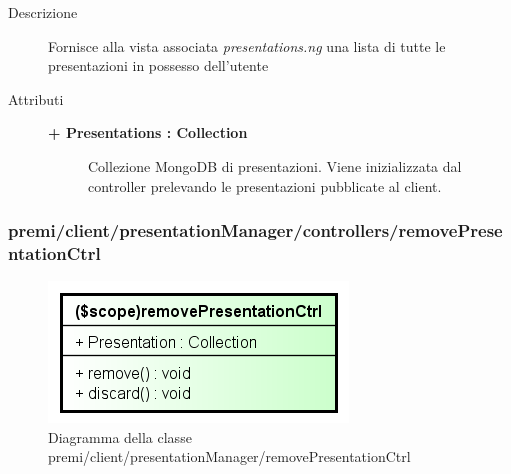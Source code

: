 \begin{description}
\item[Descrizione] \hfill
	Fornisce alla vista associata \textit{presentations.ng} una lista di tutte le presentazioni in possesso dell'utente
	
	
\item[Attributi] \hfill
	\begin{description}
		\item[\textbf{+ Presentations : Collection			}] \hfill
			Collezione MongoDB di presentazioni. Viene inizializzata dal controller prelevando le presentazioni pubblicate al client.
	\end{description}

\end{description}





\subsubsection{premi/client/presentationManager/controllers/removePresentationCtrl}
\begin{figure}[h]
\begin{center}
\includegraphics[scale=0.90]{img/diacla/removePresentationCtrl.png}
\caption{Diagramma della classe premi/client/presentationManager/removePresentationCtrl}
\end{center}
\end{figure}




